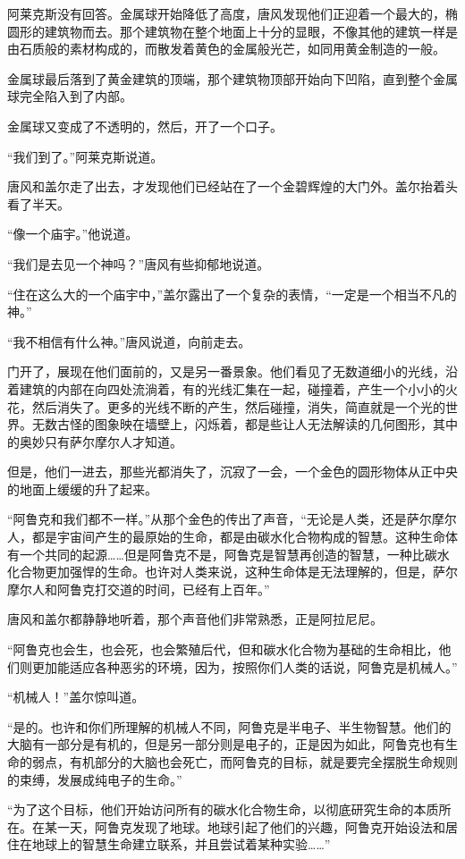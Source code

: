 阿莱克斯没有回答。金属球开始降低了高度，唐风发现他们正迎着一个最大的，椭圆形的建筑物而去。那个建筑物在整个地面上十分的显眼，不像其他的建筑一样是由石质般的素材构成的，而散发着黄色的金属般光芒，如同用黄金制造的一般。

金属球最后落到了黄金建筑的顶端，那个建筑物顶部开始向下凹陷，直到整个金属球完全陷入到了内部。

金属球又变成了不透明的，然后，开了一个口子。

“我们到了。”阿莱克斯说道。

唐风和盖尔走了出去，才发现他们已经站在了一个金碧辉煌的大门外。盖尔抬着头看了半天。

“像一个庙宇。”他说道。

“我们是去见一个神吗？”唐风有些抑郁地说道。

“住在这么大的一个庙宇中，”盖尔露出了一个复杂的表情，“一定是一个相当不凡的神。”

“我不相信有什么神。”唐风说道，向前走去。

门开了，展现在他们面前的，又是另一番景象。他们看见了无数道细小的光线，沿着建筑的内部在向四处流淌着，有的光线汇集在一起，碰撞着，产生一个小小的火花，然后消失了。更多的光线不断的产生，然后碰撞，消失，简直就是一个光的世界。无数古怪的图象映在墙壁上，闪烁着，都是些让人无法解读的几何图形，其中的奥妙只有萨尔摩尔人才知道。

但是，他们一进去，那些光都消失了，沉寂了一会，一个金色的圆形物体从正中央的地面上缓缓的升了起来。

“阿鲁克和我们都不一样。”从那个金色的传出了声音，“无论是人类，还是萨尔摩尔人，都是宇宙间产生的最原始的生命，都是由碳水化合物构成的智慧。这种生命体有一个共同的起源……但是阿鲁克不是，阿鲁克是智慧再创造的智慧，一种比碳水化合物更加强悍的生命。也许对人类来说，这种生命体是无法理解的，但是，萨尔摩尔人和阿鲁克打交道的时间，已经有上百年。”

唐风和盖尔都静静地听着，那个声音他们非常熟悉，正是阿拉尼尼。

“阿鲁克也会生，也会死，也会繁殖后代，但和碳水化合物为基础的生命相比，他们则更加能适应各种恶劣的环境，因为，按照你们人类的话说，阿鲁克是机械人。”

“机械人！”盖尔惊叫道。

“是的。也许和你们所理解的机械人不同，阿鲁克是半电子、半生物智慧。他们的大脑有一部分是有机的，但是另一部分则是电子的，正是因为如此，阿鲁克也有生命的弱点，有机部分的大脑也会死亡，而阿鲁克的目标，就是要完全摆脱生命规则的束缚，发展成纯电子的生命。”

“为了这个目标，他们开始访问所有的碳水化合物生命，以彻底研究生命的本质所在。在某一天，阿鲁克发现了地球。地球引起了他们的兴趣，阿鲁克开始设法和居住在地球上的智慧生命建立联系，并且尝试着某种实验……”

